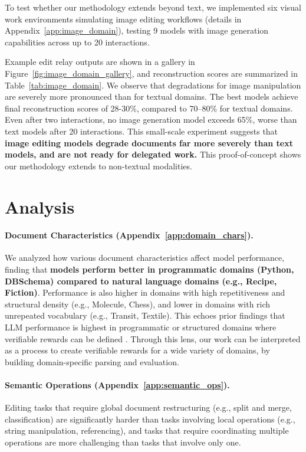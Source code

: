 \documentclass{article} %
\begin{document}
To test whether our methodology extends beyond text, we implemented six visual work environments simulating image editing workflows (details in Appendix~\ref{app:image_domain}), testing 9 models with image generation capabilities across up to 20 interactions.

Example edit relay outputs are shown in a gallery in Figure~\ref{fig:image_domain_gallery}, and reconstruction scores are summarized in Table~\ref{tab:image_domain}. We observe that degradations for image manipulation are severely more pronounced than for textual domains. The best models achieve final reconstruction scores of 28-30\%, compared to 70--80\% for textual domains. Even after two interactions, no image generation model exceeds 65\%, worse than text models after 20 interactions. This small-scale experiment suggests that \textbf{image editing models degrade documents far more severely than text models, and are not ready for delegated work.} This proof-of-concept shows our methodology extends to non-textual modalities.

\section{Analysis} \label{sec:understanding_degradation}

\paragraph{Document Characteristics (Appendix~\ref{app:domain_chars}).} We analyzed how various document characteristics affect model performance, finding that \textbf{models perform better in programmatic domains (Python, DBSchema) compared to natural language domains (e.g., Recipe, Fiction)}. Performance is also higher in domains with high repetitiveness and structural density (e.g., Molecule, Chess), and lower in domains with rich unrepeated vocabulary (e.g., Transit, Textile). This echoes prior findings that LLM performance is highest in programmatic or structured domains where verifiable rewards can be defined \citep{Suma2025DeepSeekR1IR}. Through this lens, our work can be interpreted as a process to create verifiable rewards for a wide variety of domains, by building domain-specific parsing and evaluation.

\paragraph{Semantic Operations (Appendix~\ref{app:semantic_ops}).} Editing tasks that require global document restructuring (e.g., split and merge, classification) are significantly harder than tasks involving local operations (e.g., string manipulation, referencing), and tasks that require coordinating multiple operations are more challenging than tasks that involve only one.
\end{document}
